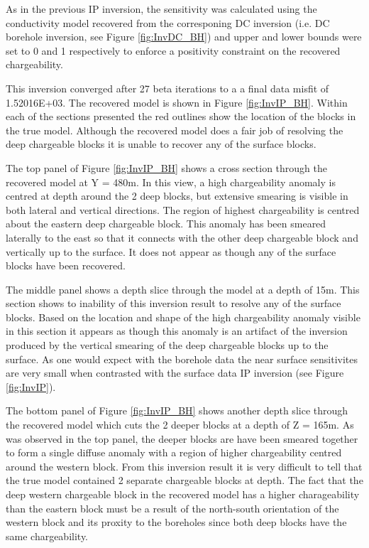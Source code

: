 As in the previous IP inversion, the sensitivity was calculated using the conductivity model recovered from the corresponing DC inversion (i.e. DC borehole inversion, see Figure \ref{fig:InvDC_BH}) and upper and lower bounds were set to 0 and 1 respectively to enforce a positivity constraint on the recovered chargeability.

This inversion converged after 27 beta iterations to a a final data misfit of 1.52016E+03. The recovered model is shown in Figure \ref{fig:InvIP_BH}. Within each of the sections presented the red outlines show the location of the blocks in the true model. Although the recovered model does a fair job of resolving the deep chargeable blocks it is unable to recover any of the surface blocks. 

The top panel of Figure \ref{fig:InvIP_BH} shows a cross section through the recovered model at Y = 480m. In this view, a high chargeability anomaly is centred at depth around the 2 deep blocks, but extensive smearing is visible in both lateral and vertical directions. The region of highest chargeability is centred about the eastern deep chargeable block. This anomaly has been smeared laterally to the east so that it connects with the other deep chargeable block and vertically up to the surface. It does not appear as though any of the surface blocks have been recovered. 

The middle panel shows a depth slice through the model at a depth of 15m. This section shows to inability of this inversion result to resolve any of the surface blocks. Based on the location and shape of the high chargeability anomaly visible in this section it appears as though this anomaly is an artifact of the inversion produced by the vertical smearing of the deep chargeable blocks up to the surface. As one would expect with the borehole data the near surface sensitivites are very small when contrasted with the surface data IP inversion (see Figure \ref{fig:InvIP}).


The bottom panel of Figure \ref{fig:InvIP_BH} shows another depth slice through the recovered model which cuts the 2 deeper blocks at a depth of Z = 165m. As was observed in the top panel, the deeper blocks are have been smeared together to form a single diffuse anomaly with a region of higher chargeability centred around the western block. From this inversion result it is very difficult to tell that the true model contained 2 separate chargeable blocks at depth. The fact that the deep western chargeable block in the recovered model has a higher charageability than the eastern block must be a result of the north-south orientation of the western block and its proxity to the boreholes since both deep blocks have the same chargeability.


